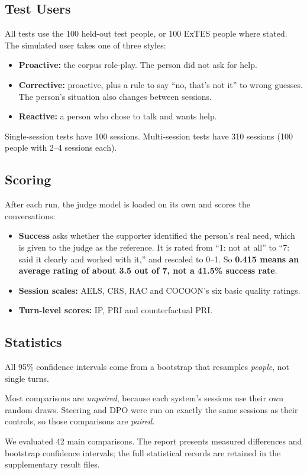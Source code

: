 \documentclass[journal]{IEEEtran}
\begin{document}
\subsection{Test Users}
All tests use the 100 held-out test people, or 100 ExTES people where stated. The simulated user takes one of three styles:
\begin{itemize}
\item \textbf{Proactive:} the corpus role-play. The person did not ask for help.
\item \textbf{Corrective:} proactive, plus a rule to say ``no, that's not it'' to wrong guesses. The person's situation also changes between sessions.
\item \textbf{Reactive:} a person who chose to talk and wants help.
\end{itemize}
Single-session tests have 100 sessions. Multi-session tests have 310 sessions (100 people with 2--4 sessions each).

\subsection{Scoring}
After each run, the judge model is loaded on its own and scores the conversations:
\begin{itemize}
\item \textbf{Success} asks whether the supporter identified the person's real need, which is given to the judge as the reference. It is rated from ``1: not at all'' to ``7: said it clearly and worked with it,'' and rescaled to 0--1. So \textbf{0.415 means an average rating of about 3.5 out of 7, not a 41.5\% success rate}.
\item \textbf{Session scales:} AELS, CRS, RAC and COCOON's six basic quality ratings.
\item \textbf{Turn-level scores:} IP, PRI and counterfactual PRI.
\end{itemize}

\subsection{Statistics}
All 95\% confidence intervals come from a bootstrap that resamples \emph{people}, not single turns.

Most comparisons are \emph{unpaired}, because each system's sessions use their own random draws. Steering and DPO were run on exactly the same sessions as their controls, so those comparisons are \emph{paired}.

We evaluated 42 main comparisons. The report presents measured differences and bootstrap confidence intervals; the full statistical records are retained in the supplementary result files.
\end{document}
